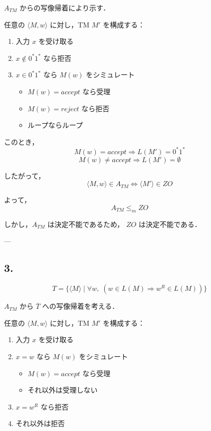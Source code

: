 \documentclass[a4paper,11pt]{ltjsarticle}
\begin{document}
$A_{TM}$ からの写像帰着により示す．

任意の $\langle M,w\rangle$ に対し，TM $M'$ を構成する：

\begin{enumerate}
    \item 入力 $x$ を受け取る
    \item $x \notin 0^*1^*$ なら拒否
    \item $x \in 0^*1^*$ なら $M(w)$ をシミュレート
    \begin{itemize}
        \item $M(w)=accept$ なら受理
        \item $M(w)=reject$ なら拒否
        \item ループならループ
    \end{itemize}
\end{enumerate}

このとき，
\[
M(w)=accept \Rightarrow L(M')=0^*1^*
\]
\[
M(w)\neq accept \Rightarrow L(M')=\emptyset
\]

したがって，
\[
\langle M,w\rangle \in A_{TM} \iff \langle M' \rangle \in ZO
\]

よって，
\[
A_{TM} \leq_m ZO
\]

しかし，$A_{TM}$ は決定不能であるため，
$ZO$ は決定不能である．

---

\subsection*{3.}
\[
T = \{ \langle M \rangle \mid \forall w,\; (w \in L(M) \Rightarrow w^R \in L(M)) \}
\]

$A_{TM}$ から $\overline{T}$ への写像帰着を考える．

任意の $\langle M,w\rangle$ に対し，TM $M'$ を構成する：

\begin{enumerate}
    \item 入力 $x$ を受け取る
    \item $x = w$ なら $M(w)$ をシミュレート
    \begin{itemize}
        \item $M(w)=accept$ なら受理
        \item それ以外は受理しない
    \end{itemize}
    \item $x = w^R$ なら拒否
    \item それ以外は拒否
\end{enumerate}
\end{document}

